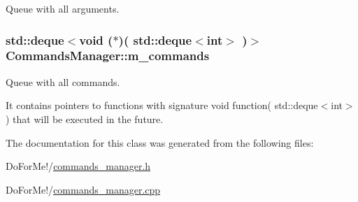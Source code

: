 Queue with all arguments. 

\hypertarget{class_commands_manager_a99e904afc8d341f390efbd2c933c3321}{
\subsubsection[{m\-\_\-commands}]{\setlength{\rightskip}{0pt plus 5cm}std\-::deque$<$void ($\ast$)( std\-::deque$<$int$>$ )$>$ Commands\-Manager\-::m\-\_\-commands\hspace{0.3cm}{\ttfamily [private]}}}\label{class_commands_manager_a99e904afc8d341f390efbd2c933c3321}


Queue with all commands. 

It contains pointers to functions with signature void function( std\-::deque$<$int$>$ ) that will be executed in the future. 

The documentation for this class was generated from the following files\-:\begin{DoxyCompactItemize}
\item 
Do\-For\-Me!/\hyperlink{commands__manager_8h}{commands\-\_\-manager.\-h}\item 
Do\-For\-Me!/\hyperlink{commands__manager_8cpp}{commands\-\_\-manager.\-cpp}\end{DoxyCompactItemize}

